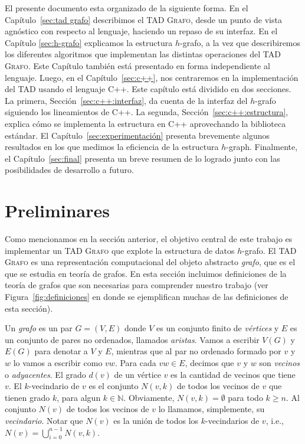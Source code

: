 \documentclass[%
    a4paper,%
    12pt,%
    twoside,%
    openright,%
    halfparskip,%
    cleardoubleempty,%
    bigheadings,%
    titlepage,%
    headsepline%
]{scrbook}
\newcommand{\Grafo}{\textsc{Grafo}\xspace}
\begin{document}
El presente documento esta organizado de la siguiente forma.  En el Capítulo~\ref{sec:tad grafo} describimos el TAD \Grafo, desde un punto de vista agnóstico con respecto al lenguaje, haciendo un repaso de su interfaz.  En el Capítulo \ref{sec:h-grafo} explicamos la estructura $h$-grafo, a la vez que describiremos los diferentes algoritmos que implementan las distintas operaciones del TAD \Grafo.  Este Capítulo también está presentado en forma independiente al lenguaje.  Luego, en el Capítulo~\ref{sec:c++}, nos centraremos en la implementación del TAD usando el lenguaje C++. Este capítulo está dividido en dos secciones. La primera, Sección~\ref{sec:c++:interfaz}, da cuenta de la interfaz del $h$-grafo siguiendo los lineamientos de C++. La segunda, Sección~\ref{sec:c++:estructura}, explica cómo se implementa la estructura en C++ aprovechando la biblioteca estándar.  El Capítulo~\ref{sec:experimentación} presenta brevemente algunos resultados en los que medimos la eficiencia de la estructura $h$-graph.  Finalmente, el Capítulo~\ref{sec:final} presenta un breve resumen de lo logrado junto con las posibilidades de desarrollo a futuro.

\section{Preliminares}
\label{sec:definiciones}

Como mencionamos en la sección anterior, el objetivo central de este trabajo es implementar un TAD \Grafo que explote la estructura de datos $h$-grafo.  El TAD \Grafo es una representación computacional del objeto abstracto \emph{grafo}, que es el que se estudia en teoría de grafos.  En esta sección incluimos definiciones de la teoría de grafos que son necesarias para comprender nuestro trabajo (ver Figura~\ref{fig:definiciones} en donde se ejemplifican muchas de las definiciones de esta sección).

Un \emph{grafo} es un par $G = (V, E)$ donde $V$ es un conjunto finito de \emph{vértices} y $E$ es un conjunto de pares no ordenados, llamados \emph{aristas}.  Vamos a escribir $V(G)$ y $E(G)$ para denotar a $V$ y $E$, mientras que al par no ordenado formado por $v$ y $w$ lo vamos a escribir como $vw$.  Para cada $vw \in E$, decimos que $v$ y $w$ son \emph{vecinos} o \emph{adyacentes}.  El grado $d(v)$ de un vértice $v$ es la cantidad de vecinos que tiene $v$.  El $k$-vecindario de $v$ es el conjunto $N(v, k)$ de todos los vecinos de $v$ que tienen grado $k$, para algun $k \in \mathbb{N}$.  Obviamente, $N(v,k) = \emptyset$ para todo $k \geq n$.  Al conjunto $N(v)$ de todos los vecinos de $v$ lo llamamos, simplemente, su \emph{vecindario}.  Notar que $N(v)$ es la unión de todos los $k$-vecindarios de $v$, i.e., $N(v) = \bigcup_{i=0}^{n-1}N(v,k)$.
\end{document}

